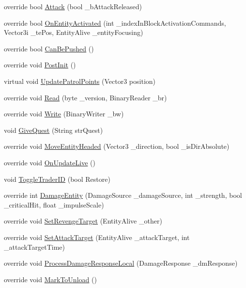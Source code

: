 \begin{DoxyCompactItemize}
\item 
override bool \mbox{\hyperlink{class_entity_alive_s_d_x_a52726dd94c03501cc15602abed4b4b8f}{Attack}} (bool \+\_\+b\+Attack\+Released)
\item 
override bool \mbox{\hyperlink{class_entity_alive_s_d_x_a146b9caa2af4c7a13992bd57a389cf4a}{On\+Entity\+Activated}} (int \+\_\+index\+In\+Block\+Activation\+Commands, Vector3i \+\_\+te\+Pos, Entity\+Alive \+\_\+entity\+Focusing)
\item 
override bool \mbox{\hyperlink{class_entity_alive_s_d_x_a64e3bfccc3318ae7120574173899a2b1}{Can\+Be\+Pushed}} ()
\item 
override void \mbox{\hyperlink{class_entity_alive_s_d_x_ad27363e0b5517bfe08dc2f145a0a3b76}{Post\+Init}} ()
\item 
virtual void \mbox{\hyperlink{class_entity_alive_s_d_x_a7a31604214486ba310819d2f39be38cc}{Update\+Patrol\+Points}} (Vector3 position)
\item 
override void \mbox{\hyperlink{class_entity_alive_s_d_x_a8ce4e466096f23ab428ab17bd68f2dbf}{Read}} (byte \+\_\+version, Binary\+Reader \+\_\+br)
\item 
override void \mbox{\hyperlink{class_entity_alive_s_d_x_a10a0eb26cd594b2bc2afcfc4a065db56}{Write}} (Binary\+Writer \+\_\+bw)
\item 
void \mbox{\hyperlink{class_entity_alive_s_d_x_a5540d79d7e8116d371151b982b8a6c6c}{Give\+Quest}} (String str\+Quest)
\item 
override void \mbox{\hyperlink{class_entity_alive_s_d_x_a4085ffe371fe6c2c7d78f0ac6540d136}{Move\+Entity\+Headed}} (Vector3 \+\_\+direction, bool \+\_\+is\+Dir\+Absolute)
\item 
override void \mbox{\hyperlink{class_entity_alive_s_d_x_a3d648f69f76ad883dd30cca625d02bda}{On\+Update\+Live}} ()
\item 
void \mbox{\hyperlink{class_entity_alive_s_d_x_a379f0188f72d630b1241cce425e8022d}{Toggle\+Trader\+ID}} (bool Restore)
\item 
override int \mbox{\hyperlink{class_entity_alive_s_d_x_a289eae1e8162bdd52315a3287b42dbbe}{Damage\+Entity}} (Damage\+Source \+\_\+damage\+Source, int \+\_\+strength, bool \+\_\+critical\+Hit, float \+\_\+impulse\+Scale)
\item 
override void \mbox{\hyperlink{class_entity_alive_s_d_x_a69499ec3da8165d4be0bf1242ba529da}{Set\+Revenge\+Target}} (Entity\+Alive \+\_\+other)
\item 
override void \mbox{\hyperlink{class_entity_alive_s_d_x_a090c617707f4c255fc913c1161142b54}{Set\+Attack\+Target}} (Entity\+Alive \+\_\+attack\+Target, int \+\_\+attack\+Target\+Time)
\item 
override void \mbox{\hyperlink{class_entity_alive_s_d_x_acc83fe2b48def8b8ebbaa550a94fc2f5}{Process\+Damage\+Response\+Local}} (Damage\+Response \+\_\+dm\+Response)
\item 
override void \mbox{\hyperlink{class_entity_alive_s_d_x_a19d698a3a5bae15499e84741ef5ab0c3}{Mark\+To\+Unload}} ()
\end{DoxyCompactItemize}
